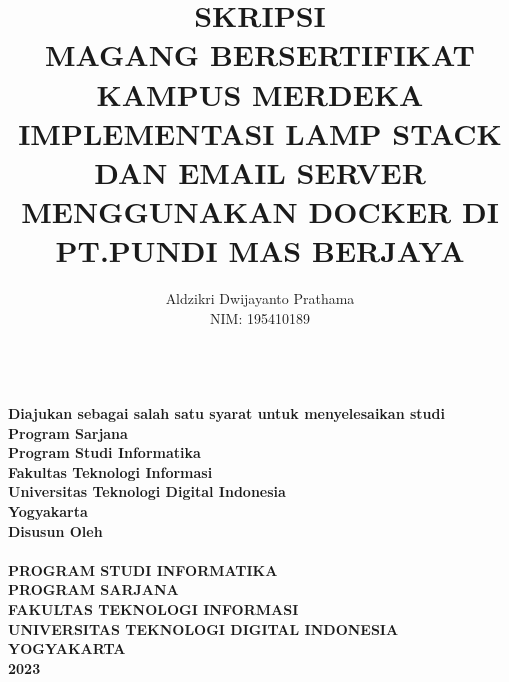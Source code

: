 \documentclass[../SKRIPSI_ALDZIKRI_DWIJAYANTO_PRATHAMA.tex]{subfiles}
\begin{document}
\setcounter{page}{1}
\title{{\Large SKRIPSI\\
  \Large{MAGANG BERSERTIFIKAT KAMPUS MERDEKA\\ IMPLEMENTASI LAMP STACK DAN EMAIL SERVER MENGGUNAKAN DOCKER DI PT.PUNDI MAS BERJAYA}}}
\author{Aldzikri Dwijayanto Prathama
    \\NIM: 195410189}
\makeatletter
\begin{titlepage}
    \begin{center}
        {\huge \bfseries \@title}\\[5ex]
        {\large \bfseries Diajukan sebagai salah satu syarat
        untuk menyelesaikan studi\\ Program Sarjana\\
        Program Studi Informatika\\ Fakultas Teknologi Informasi\\
        Universitas Teknologi Digital Indonesia\\
        Yogyakarta}\\[5ex]
        {\large \bfseries Disusun Oleh\\ \@author}\\[5ex]
        {\large \bfseries {PROGRAM STUDI INFORMATIKA\\
        PROGRAM SARJANA\\
        FAKULTAS TEKNOLOGI INFORMASI\\
        UNIVERSITAS TEKNOLOGI DIGITAL INDONESIA\\
        YOGYAKARTA\\
        2023}}
    \end{center}
\end{titlepage}
\makeatother
\end{document}
